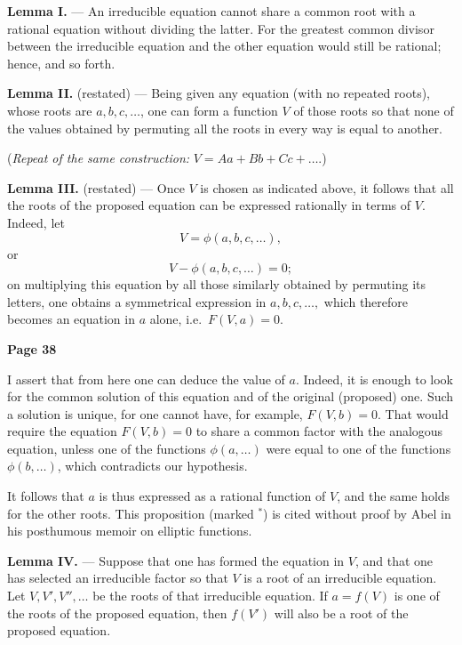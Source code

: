 \documentclass{article}
\begin{document}
\medskip

\noindent
\textbf{Lemma I.} --- An irreducible equation cannot share a common root with a rational equation without dividing the latter. For the greatest common divisor between the irreducible equation and the other equation would still be rational; hence, and so forth.

\smallskip

\noindent
\textbf{Lemma II.} (restated) --- Being given any equation (with no repeated roots), whose roots are \(a, b, c, \dots\), one can form a function \(V\) of those roots so that none of the values obtained by permuting all the roots in every way is equal to another.

\medskip

\noindent
(\textit{Repeat of the same construction:} \(V = A a + B b + C c + \dots\).)

\medskip

\noindent
\textbf{Lemma III.} (restated) --- Once \(V\) is chosen as indicated above, it follows that all the roots of the proposed equation can be expressed rationally in terms of \(V\). Indeed, let
\[
V = \phi(a, b, c, \dots),
\]
or
\[
V - \phi(a, b, c, \dots) = 0;
\]
on multiplying this equation by all those similarly obtained by permuting its letters, one obtains a symmetrical expression in \(a, b, c, \dots,\) which therefore becomes an equation in \(a\) alone, i.e.~\(F(V, a) = 0\).

\bigskip

\noindent
\textbf{Page 38}

\medskip

\noindent
I assert that from here one can deduce the value of \(a\). Indeed, it is enough to look for the common solution of this equation and of the original (proposed) one. Such a solution is unique, for one cannot have, for example, \(F(V, b) = 0\). That would require the equation \(F(V, b) = 0\) to share a common factor with the analogous equation, unless one of the functions \(\phi(a, \dots)\) were equal to one of the functions \(\phi(b, \dots)\), which contradicts our hypothesis.

\smallskip

\noindent
It follows that \(a\) is thus expressed as a rational function of \(V\), and the same holds for the other roots. This proposition (marked \(^*\)) is cited without proof by Abel in his posthumous memoir on elliptic functions.

\medskip

\noindent
\textbf{Lemma IV.} --- Suppose that one has formed the equation in \(V\), and that one has selected an irreducible factor so that \(V\) is a root of an irreducible equation. Let \(V, V', V'', \dots\) be the roots of that irreducible equation. If \(a = f(V)\) is one of the roots of the proposed equation, then \(f(V')\) will also be a root of the proposed equation.
\end{document}
